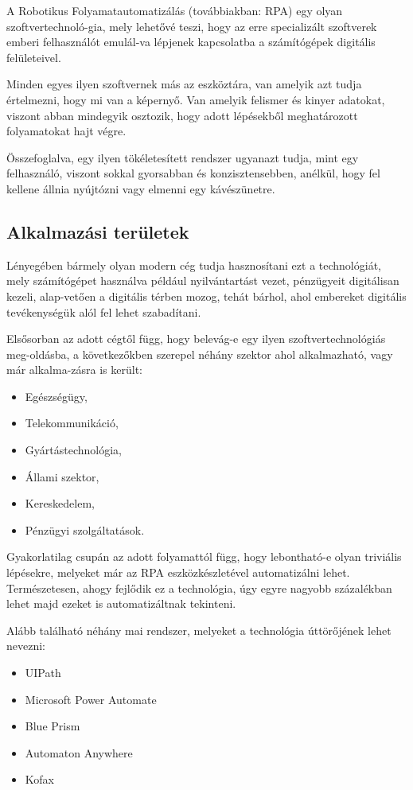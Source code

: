 
A Robotikus Folyamatautomatizálás (továbbiakban: RPA) egy olyan szoftvertechnoló\hyp{}gia, mely lehetővé teszi, hogy az erre specializált szoftverek emberi felhasználót emulál\hyp{}va lépjenek kapcsolatba a számítógépek digitális felületeivel.

Minden egyes ilyen szoftvernek más az eszköztára, van amelyik azt tudja értelmezni, hogy mi van a képernyő. Van amelyik felismer és kinyer adatokat, viszont abban mindegyik osztozik, hogy adott lépésekből meghatározott folyamatokat hajt végre.

Összefoglalva, egy ilyen tökéletesített rendszer ugyanazt tudja, mint egy felhasználó, viszont sokkal gyorsabban és konzisztensebben, anélkül, hogy fel kellene állnia nyújtózni vagy elmenni egy kávészünetre.

\subsection{Alkalmazási területek}

Lényegében bármely olyan modern cég tudja hasznosítani ezt a technológiát, mely számítógépet használva például nyilvántartást vezet, pénzügyeit digitálisan kezeli, alap\hyp{}vetően a digitális térben mozog, tehát bárhol, ahol embereket digitális tevékenységük alól fel lehet szabadítani.

Elsősorban az adott cégtől függ, hogy belevág-e egy ilyen szoftvertechnológiás meg\hyp{}oldásba, a következőkben szerepel néhány szektor ahol alkalmazható, vagy már alkalma\hyp{}zásra is került:
\begin{itemize}
	\item Egészségügy,
	\item Telekommunikáció,
	\item Gyártástechnológia,
	\item Állami szektor,
	\item Kereskedelem,
	\item Pénzügyi szolgáltatások.
\end{itemize}

Gyakorlatilag csupán az adott folyamattól függ, hogy lebontható-e olyan triviális lépésekre, melyeket már az RPA eszközkészletével automatizálni lehet. Természetesen, ahogy fejlődik ez a technológia, úgy egyre nagyobb százalékban lehet majd ezeket is automatizáltnak tekinteni.

Alább található néhány mai rendszer, melyeket a technológia úttörőjének lehet nevezni:
\begin{itemize}
	\item UIPath
	\item Microsoft Power Automate
	\item Blue Prism
	\item Automaton Anywhere
	\item Kofax
\end{itemize}

